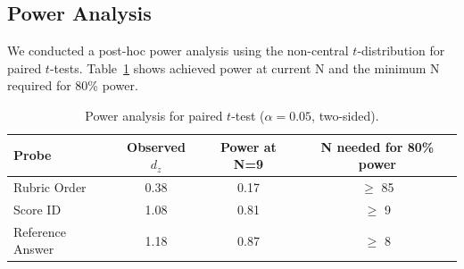 \subsection{Power Analysis}

We conducted a post-hoc power analysis using the non-central $t$-distribution for paired $t$-tests. Table~\ref{tab:power} shows achieved power at current N and the minimum N required for 80\% power.

\begin{table}[h]
\centering\small
\caption{Power analysis for paired $t$-test ($\alpha = 0.05$, two-sided).}
\label{tab:power}
\begin{tabular}{lccc}
\toprule
\textbf{Probe} & \textbf{Observed $d_z$} & \textbf{Power at N=9} & \textbf{N needed for 80\% power} \\
\midrule
Rubric Order & 0.38 & 0.17 & $\geq$ 85 \\
Score ID & 1.08 & 0.81 & $\geq$ 9 \\
Reference Answer & 1.18 & 0.87 & $\geq$ 8 \\
\bottomrule
\end{tabular}
\par\vspace{2mm}
\end{table}
